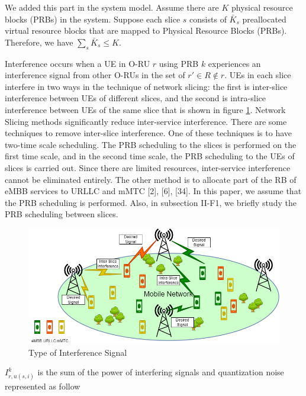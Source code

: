 \documentclass[12pt, letterpaper]{article}
\begin{document}
{We added this part in the system model.
Assume there are $K$ physical resource blocks (PRBs) in the system. Suppose each slice $s$ consists of $\bar{K}_s$ preallocated virtual resource blocks that are mapped to Physical Resource Blocks (PRBs). Therefore, we have $\sum_s \bar{K}_s \leq K$.

Interference occurs when a UE in O-RU $r$ using PRB $k$ experiences an interference signal from other O-RUs in the set of $r' \in R \not\in
 r$. UEs in each slice interfere in two ways in the technique of network slicing: the first is inter-slice interference between UEs of different slices, and the second is intra-slice interference between UEs of the same slice that is shown in figure \ref{fig:intf}.
Network Slicing methods significantly reduce inter-service interference.
There are some techniques to remove inter-slice interference. One of these techniques is to have two-time scale scheduling. The PRB scheduling to the slices is performed on the first time scale, and in the second time scale, the PRB scheduling to the UEs of slices is carried out. Since there are limited resources, inter-service interference cannot be eliminated entirely. The other method is to allocate part of the RB of eMBB services to URLLC and mMTC  [2], [6], [34]. In this paper, we assume that the PRB scheduling is performed. Also, in subsection II-F1, we briefly study the PRB scheduling between slices.
\begin{figure}
  \centering
  \captionsetup{justification=centering}
    \includegraphics[scale = 0.35]{Interference.png}
  \caption{Type of Interference Signal}
  \label{fig:intf}
\end{figure}
$I_{r,u(s,i)}^{k}$ is the sum of the power of interfering signals and quantization noise represented as follow
\begin{subequations}\label{eqI}

\end{subequations}}
\end{document}
